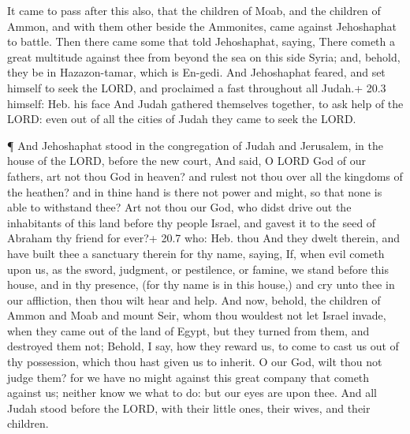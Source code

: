 It came to pass after this also, that the children of Moab,
and the children of Ammon, and with them other beside the Ammonites,
came against Jehoshaphat to battle.  Then there came some
that told Jehoshaphat, saying, There cometh a great multitude against
thee from beyond the sea on this side Syria; and, behold, they be in
Hazazon-tamar, which is En-gedi.  And Jehoshaphat feared,
and set himself to seek the LORD, and proclaimed a fast throughout all
Judah.+ 20.3 himself: Heb. his face  And Judah gathered
themselves together, to ask help of the LORD: even out of all the cities
of Judah they came to seek the LORD.

 ¶ And Jehoshaphat stood in the congregation of Judah and
Jerusalem, in the house of the LORD, before the new court, 
And said, O LORD God of our fathers, art not thou God in heaven? and
rulest not thou over all the kingdoms of the heathen? and in thine hand
is there not power and might, so that none is able to withstand thee?
 Art not thou our God, who didst drive out the inhabitants
of this land before thy people Israel, and gavest it to the seed of
Abraham thy friend for ever?+ 20.7 who: Heb. thou  And they
dwelt therein, and have built thee a sanctuary therein for thy name,
saying,  If, when evil cometh upon us, as the sword,
judgment, or pestilence, or famine, we stand before this house, and in
thy presence, (for thy name is in this house,) and cry unto thee in our
affliction, then thou wilt hear and help.  And now, behold,
the children of Ammon and Moab and mount Seir, whom thou wouldest not
let Israel invade, when they came out of the land of Egypt, but they
turned from them, and destroyed them not;  Behold, I say,
how they reward us, to come to cast us out of thy possession, which thou
hast given us to inherit.  O our God, wilt thou not judge
them? for we have no might against this great company that cometh
against us; neither know we what to do: but our eyes are upon thee.
 And all Judah stood before the LORD, with their little
ones, their wives, and their children.

